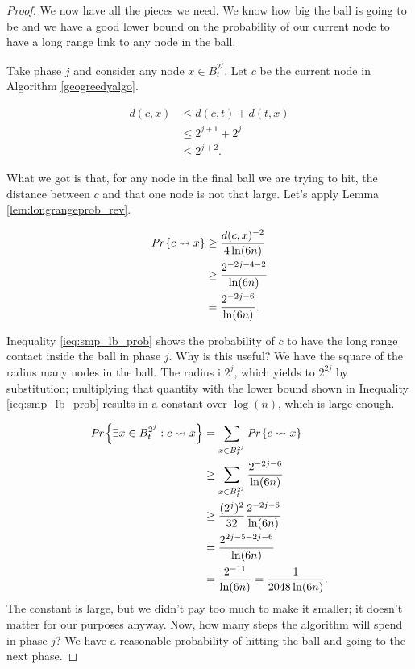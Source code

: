 \begin{proof}
We now have all the pieces we need. We know how big the ball is going to be and we have a good lower bound on the probability of our current node to have a long range link to any node in the ball.

Take phase $j$ and consider any node $x \in B_t^{2^j}$. Let $c$ be the current node in Algorithm \ref{geogreedyalgo}.

\begin{align}
d(c, x) &\leq d(c, t) + d(t, x)\\
&\leq 2^{j+1} + 2^j\\
&\leq 2^{j+2}.
\end{align}

What we got is that, for any node in the final ball we are trying to hit, the distance between $c$ and that one node is not that large. Let's apply Lemma \ref{lem:longrangeprob_rev}.

\begin{align}
\emph{Pr}\left\{c \rightsquigarrow x\right\} &\geq \frac{d(c, x)^{-2}}{4\ln(6n)}\\
&\geq \frac{2^{-2j -4 -2}}{\ln(6n)}\\
& =\frac{2^{-2j -6}}{\ln(6n)} \label{ieq:smp_lb_prob}.
\end{align}

Inequality \ref{ieq:smp_lb_prob} shows the probability of $c$ to have the long range contact inside the ball in phase $j$. Why is this useful? We have the square of the radius many nodes in the ball. The radius i $2^j$, which yields to $2^{2j}$ by substitution; multiplying that quantity with the lower bound shown in Inequality \ref{ieq:smp_lb_prob} results in a constant over $\log(n)$, which is large enough.

\begin{align}
\emph{Pr}\left\{\exists x \in B_t^{2^j} : c \rightsquigarrow x\right\} &= \sum_{x \in B_t^{2^j}}\emph{Pr}\left\{ c \rightsquigarrow x\right\}\\
&\geq \sum_{x \in B_t^{2^j}}\frac{2^{-2j -6}}{\ln(6n)}\\
&\geq\frac{(2^{j})^2}{32}\frac{2^{-2j -6}}{\ln(6n)}\\
&=\frac{2^{2j-5-2j-6}}{\ln(6n)}\\
&=\frac{2^{-11}}{\ln(6n)} = \frac{1}{2048\ln(6n)}.
\end{align}
The constant is large, but we didn't pay too much to make it smaller; it doesn't matter for our purposes anyway. Now, how many steps the algorithm will spend in phase $j$? We have a reasonable probability of hitting the ball and going to the next phase.


\end{proof}
